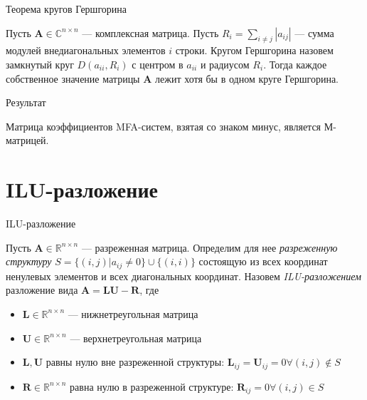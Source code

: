 \documentclass[aspectratio=169]{beamer}
\begin{document}
\begin{frame}{Теорема кругов Гершгорина}
\begin{theorem}[Гершгорин, 1931]
	Пусть $\mathbf{A} \in \mathbb{C}^{n \times n}$ --- комплексная матрица. Пусть $R_i = \sum_{i \neq j} |a_{ij}|$ --- сумма модулей внедиагональных элементов $i$ строки. Кругом Гершгорина назовем замкнутый круг $D(a_{ii}, R_i)$ с центром в $a_{ii}$ и радиусом $R_i$. Тогда каждое собственное значение матрицы $\mathbf{A}$ лежит хотя бы в одном круге Гершгорина. 
\end{theorem}
\end{frame}

\begin{frame}{Результат}
\begin{theorem}
	Матрица коэффициентов MFA-систем, взятая со знаком минус, является М-матрицей.
\end{theorem}
\end{frame}

\section{ILU-разложение}
\begin{frame}{ILU-разложение}
\begin{theorem}
	Пусть $\mathbf{A} \in \mathbb{R}^{n \times n}$ --- разреженная матрица. Определим для нее \emph{разреженную структуру} $S = \{(i, j) | a_{ij} \neq 0\} \cup \{(i,i)\}$ состоящую из всех координат ненулевых элементов и всех диагональных координат. Назовем \emph{ILU-разложением} разложение вида $\mathbf{A} = \mathbf{L}\mathbf{U} - \mathbf{R}$, где
	\begin{itemize}
		\item $\mathbf{L} \in \mathbb{R}^{n \times n}$ --- нижнетреугольная матрица
		\item $\mathbf{U} \in \mathbb{R}^{n \times n}$ --- верхнетреугольная матрица
		\item $\mathbf{L}, \mathbf{U}$ равны нулю вне разреженной структуры: $\mathbf{L}_{ij} = \mathbf{U}_{ij} = 0 \forall (i, j) \notin S$
		\item $\mathbf{R} \in \mathbb{R}^{n \times n}$ равна нулю в разреженной структуре: $\mathbf{R}_{ij} = 0 \forall (i, j) \in S$
	\end{itemize}
\end{theorem}
\end{frame}
\end{document}
